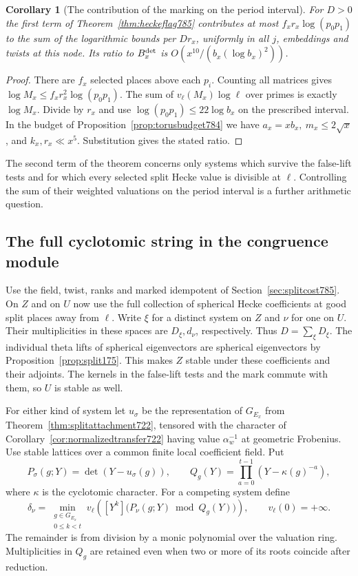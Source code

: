 \documentclass[a4paper,11pt]{article}
\newtheorem{corollary}[proposition]{Corollary}
\theoremstyle{definition}
\theoremstyle{remark}
\numberwithin{equation}{section}
\begin{document}
\begin{corollary}[The contribution of the marking on the period interval]
\leavevmode\label{cor:markbudget785}
For \(D>0\) the first term of
Theorem~\ref{thm:heckeflag785} contributes at most
\(f_x r_x\log(p_0p_1)\) to the sum of the logarithmic
bounds per \(D r_x\), uniformly in all \(j\), embeddings
and twists at this node. Its ratio to \(B_x^{\rm det}\)
is \(O(x^{10}/(b_x(\log b_x)^2))\).
\end{corollary}
\begin{proof}
There are \(f_x\) selected places above each \(p_i\).
Counting all matrices gives
\(\log M_x\le f_x r_x^2\log(p_0p_1)\).
The sum of \(v_\ell(M_x)\log\ell\) over primes is
exactly \(\log M_x\). Divide by \(r_x\) and use
\(\log(p_0p_1)\le22\log b_x\) on the prescribed
interval. In the budget of Proposition~\ref{prop:torusbudget784}
we have \(a_x=xb_x,\ m_x\le2\sqrt{x}\), and
\(k_x,r_x\ll x^5\). Substitution gives the stated ratio.
\end{proof}
The second term of the theorem concerns only systems
which survive the false-lift tests and for which every
selected split Hecke value is divisible at \(\ell\).
Controlling the sum of their weighted valuations on the
period interval is a further arithmetic question.
\clearpage

\subsection{The full cyclotomic string in the congruence module}
\label{sec:fullstring786}
Use the field, twist, ranks and marked idempotent of
Section~\ref{sec:splitcost785}. On \(Z\) and on \(U\)
now use the full collection of spherical Hecke coefficients
at good split places away from \(\ell\). Write \(\xi\)
for a distinct system on \(Z\) and \(\nu\) for one on \(U\).
Their multiplicities in these spaces are \(D_\xi,d_\nu\),
respectively. Thus \(D=\sum_\xi D_\xi\). The individual
theta lifts of spherical eigenvectors are spherical
eigenvectors by Proposition~\ref{prop:split175}. This
makes \(Z\) stable under these coefficients and their
adjoints. The kernels in the false-lift tests and the
mark commute with them, so \(U\) is stable as well.

For either kind of system let \(u_\sigma\) be the
representation of \(G_{E_x}\) from
Theorem~\ref{thm:splitattachment722}, tensored with
the character of Corollary~\ref{cor:normalizedtransfer722}
having value \(\alpha_w^{-1}\) at geometric Frobenius.
Use stable lattices over a common finite local coefficient
field. Put
\[
 P_\sigma(g;Y)=\det(Y-u_\sigma(g)),\qquad
 Q_g(Y)=\prod_{a=0}^{t-1}(Y-\kappa(g)^{-a}),
\]
where \(\kappa\) is the cyclotomic character. For a
competing system define
\[
 \delta_\nu=\min_{\substack{g\in G_{E_x}\\0\le k<t}}
 v_\ell\!\left([Y^k]\big(P_\nu(g;Y)\bmod Q_g(Y)\big)\right),
                 \qquad v_\ell(0)=+\infty .
\]
The remainder is from division by a monic polynomial over
the valuation ring. Multiplicities in \(Q_g\) are retained
even when two or more of its roots coincide after reduction.
\end{document}
